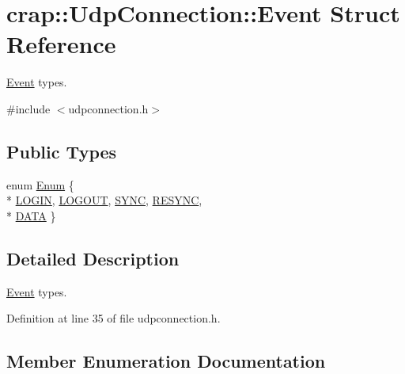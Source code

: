 \hypertarget{structcrap_1_1_udp_connection_1_1_event}{}\section{crap\+:\+:Udp\+Connection\+:\+:Event Struct Reference}
\label{structcrap_1_1_udp_connection_1_1_event}


\hyperlink{structcrap_1_1_udp_connection_1_1_event}{Event} types.  




{\ttfamily \#include $<$udpconnection.\+h$>$}

\subsection*{Public Types}
\begin{DoxyCompactItemize}
\item 
enum \hyperlink{structcrap_1_1_udp_connection_1_1_event_adcb4025fc6cb1f099dd37b511c96bb15}{Enum} \{ \\*
\hyperlink{structcrap_1_1_udp_connection_1_1_event_adcb4025fc6cb1f099dd37b511c96bb15a63e88d02ff68da95e40ceb1e4454934d}{L\+O\+G\+I\+N}, 
\hyperlink{structcrap_1_1_udp_connection_1_1_event_adcb4025fc6cb1f099dd37b511c96bb15a96ab19437948288c970184c68621253b}{L\+O\+G\+O\+U\+T}, 
\hyperlink{structcrap_1_1_udp_connection_1_1_event_adcb4025fc6cb1f099dd37b511c96bb15a4c0f37a1c36a768c2f8a012c526fe113}{S\+Y\+N\+C}, 
\hyperlink{structcrap_1_1_udp_connection_1_1_event_adcb4025fc6cb1f099dd37b511c96bb15aa89df39256f9625f4bb234cb4b59b812}{R\+E\+S\+Y\+N\+C}, 
\\*
\hyperlink{structcrap_1_1_udp_connection_1_1_event_adcb4025fc6cb1f099dd37b511c96bb15ad32c0c0d1232eb3fa5f62bbd2bbd1e7f}{D\+A\+T\+A}
 \}
\end{DoxyCompactItemize}


\subsection{Detailed Description}
\hyperlink{structcrap_1_1_udp_connection_1_1_event}{Event} types. 

Definition at line 35 of file udpconnection.\+h.



\subsection{Member Enumeration Documentation}
\hypertarget{structcrap_1_1_udp_connection_1_1_event_adcb4025fc6cb1f099dd37b511c96bb15}{}
